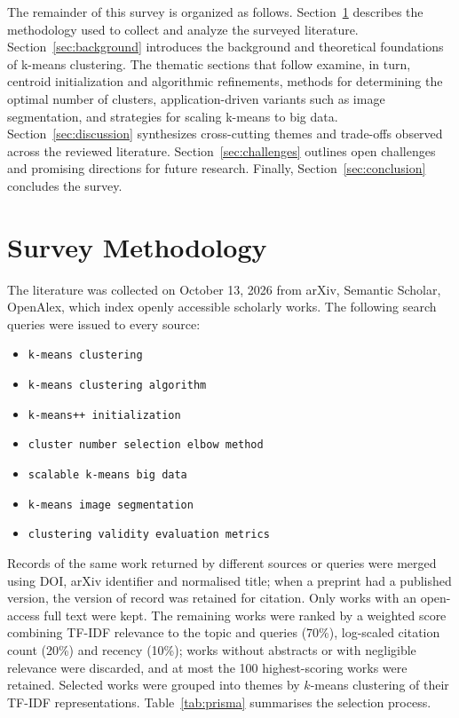 The remainder of this survey is organized as follows. Section~\ref{sec:method} describes the methodology used to collect and analyze the surveyed literature. Section~\ref{sec:background} introduces the background and theoretical foundations of k-means clustering. The thematic sections that follow examine, in turn, centroid initialization and algorithmic refinements, methods for determining the optimal number of clusters, application-driven variants such as image segmentation, and strategies for scaling k-means to big data. Section~\ref{sec:discussion} synthesizes cross-cutting themes and trade-offs observed across the reviewed literature. Section~\ref{sec:challenges} outlines open challenges and promising directions for future research. Finally, Section~\ref{sec:conclusion} concludes the survey.

\section{Survey Methodology}\label{sec:method}
The literature was collected on October 13, 2026 from arXiv, Semantic Scholar, OpenAlex, which index openly accessible scholarly works. The following search queries were issued to every source:
\begin{itemize}
\item \texttt{k-means clustering}
\item \texttt{k-means clustering algorithm}
\item \texttt{k-means++ initialization}
\item \texttt{cluster number selection elbow method}
\item \texttt{scalable k-means big data}
\item \texttt{k-means image segmentation}
\item \texttt{clustering validity evaluation metrics}
\end{itemize}

Records of the same work returned by different sources or queries were merged using DOI, arXiv identifier and normalised title; when a preprint had a published version, the version of record was retained for citation. Only works with an open-access full text were kept. The remaining works were ranked by a weighted score combining TF-IDF relevance to the topic and queries (70\%), log-scaled citation count (20\%) and recency (10\%); works without abstracts or with negligible relevance were discarded, and at most the 100 highest-scoring works were retained. Selected works were grouped into themes by $k$-means clustering of their TF-IDF representations. Table~\ref{tab:prisma} summarises the selection process.

